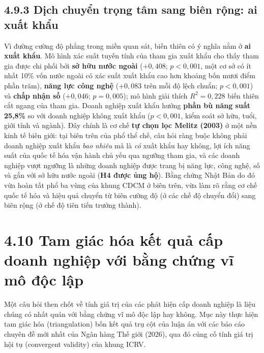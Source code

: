 \documentclass[
  a4paper,
  13pt]{extreport}
\begin{document}
\hypertarget{dux1ecbch-chuyux1ec3n-trux1ecdng-tuxe2m-sang-biuxean-rux1ed9ng-ai-xuux1ea5t-khux1ea9u}{%
\subsection{4.9.3 Dịch chuyển trọng tâm sang biên rộng: ai xuất
khẩu}\label{dux1ecbch-chuyux1ec3n-trux1ecdng-tuxe2m-sang-biuxean-rux1ed9ng-ai-xuux1ea5t-khux1ea9u}}

Vì đường cường độ phẳng trong miền quan sát, biến thiên có ý nghĩa nằm ở
\textbf{ai xuất khẩu}. Mô hình xác suất tuyến tính của tham gia xuất
khẩu cho thấy tham gia được chi phối bởi \textbf{sở hữu nước ngoài}
(\(+0{,}408\); \(p < 0{,}001\), một cơ sở có ít nhất 10\% vốn nước ngoài
có xác suất xuất khẩu cao hơn khoảng bốn mươi điểm phần trăm),
\textbf{năng lực công nghệ} (\(+0{,}083\) trên mỗi độ lệch chuẩn;
\(p < 0{,}001\)) và \textbf{chấp nhận số} (\(+0{,}046\);
\(p = 0{,}005\)); mô hình giải thích \(R^2 = 0{,}228\) biến thiên cắt
ngang của tham gia. Doanh nghiệp xuất khẩu hưởng \textbf{phần bù năng
suất 25,8\%} so với doanh nghiệp không xuất khẩu (\(p < 0{,}001\), kiểm
soát sở hữu, tuổi, giới tính và ngành). Đây chính là cơ chế \textbf{tự
chọn lọc Melitz (2003)} ở một nền kinh tế biên giới: tại biên trên của
phổ thể chế, câu hỏi ràng buộc không phải doanh nghiệp xuất khẩu
\emph{bao nhiêu} mà là \emph{có} xuất khẩu hay không, lợi ích năng suất
của quốc tế hóa vận hành chủ yếu qua ngưỡng tham gia, và các doanh
nghiệp vượt ngưỡng là những doanh nghiệp được trang bị năng lực, công
nghệ, số và gắn với sở hữu nước ngoài (\textbf{H4 được ủng hộ}). Bằng
chứng Nhật Bản do đó vừa hoàn tất phổ ba vùng của khung CDCM ở biên
trên, vừa làm rõ rằng cơ chế quốc tế hóa và hiệu quả chuyển từ biên
cường độ (ở các chế độ chuyển đổi) sang biên rộng (ở chế độ tiên tiến
trưởng thành).

\hypertarget{tam-giuxe1c-huxf3a-kux1ebft-quux1ea3-cux1ea5p-doanh-nghiux1ec7p-vux1edbi-bux1eb1ng-chux1ee9ng-vux129-muxf4-ux111ux1ed9c-lux1eadp}{%
\section{4.10 Tam giác hóa kết quả cấp doanh nghiệp với bằng chứng vĩ mô
độc
lập}\label{tam-giuxe1c-huxf3a-kux1ebft-quux1ea3-cux1ea5p-doanh-nghiux1ec7p-vux1edbi-bux1eb1ng-chux1ee9ng-vux129-muxf4-ux111ux1ed9c-lux1eadp}}

Một câu hỏi then chốt về tính giá trị của các phát hiện cấp doanh nghiệp
là liệu chúng có nhất quán với bằng chứng vĩ mô độc lập hay không. Mục
này thực hiện tam giác hóa (triangulation) bốn kết quả trụ cột của luận
án với các báo cáo chuyên đề mới nhất của Ngân hàng Thế giới (2026), qua
đó củng cố tính giá trị hội tụ (convergent validity) của khung ICRV.
\end{document}
